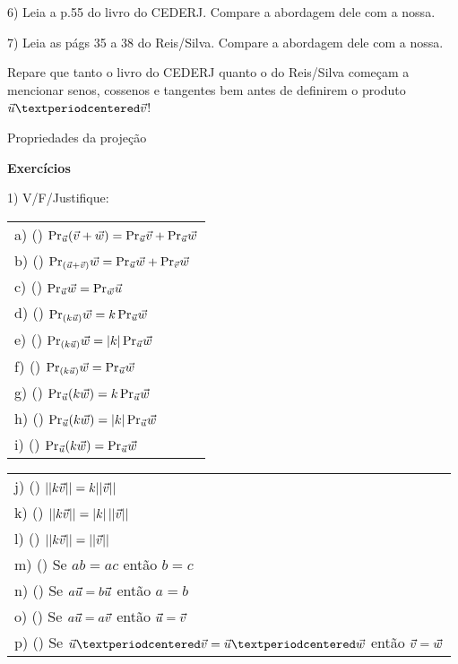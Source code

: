 \documentclass[oneside]{book}
\begin{document}
\bsk

6) Leia a p.55 do livro do CEDERJ. Compare a abordagem dele com a nossa.

7) Leia as págs 35 a 38 do Reis/Silva. Compare a abordagem dele com a
nossa.

Repare que tanto o livro do CEDERJ quanto o do Reis/Silva começam a
mencionar senos, cossenos e tangentes bem antes de definirem o produto
$\uu·\vv$!






\newpage

%
 {Propriedades da projeção}

{\bf Exercícios}

\ssk

1) V/F/Justifique:

\begin{tabular}[t]{l}
a) (\;\;) ${\text{Pr}}_{\vec u}({\vec v}+{\vec w}) = {\text{Pr}}_{\vec u} {\vec v} + {\text{Pr}}_{\vec u} {\vec w}$      \\
b) (\;\;) ${\text{Pr}}_{({\vec u}+{\vec v})} {\vec w} = {\text{Pr}}_{\vec u} {\vec w} + {\text{Pr}}_{\vec v} {\vec w}$   \\
c) (\;\;) ${\text{Pr}}_{\vec u} {\vec w} = {\text{Pr}}_{\vec w} {\vec u}$                         \\
d) (\;\;) ${\text{Pr}}_{(k{\vec u})} {\vec w} = k \, {\text{Pr}}_{\vec u} {\vec w}$               \\
e) (\;\;) ${\text{Pr}}_{(k{\vec u})} {\vec w} = |k| \, {\text{Pr}}_{\vec u} {\vec w}$             \\
f) (\;\;) ${\text{Pr}}_{(k{\vec u})} {\vec w} = {\text{Pr}}_{\vec u} {\vec w}$                    \\
g) (\;\;) ${\text{Pr}}_{\vec u} (k{\vec w}) = k \, {\text{Pr}}_{\vec u} {\vec w}$                 \\
h) (\;\;) ${\text{Pr}}_{\vec u} (k{\vec w}) = |k| \, {\text{Pr}}_{\vec u} {\vec w}$               \\
i) (\;\;) ${\text{Pr}}_{\vec u} (k{\vec w}) = {\text{Pr}}_{\vec u} {\vec w}$                      \\
\end{tabular}
\qquad
\begin{tabular}[t]{l}
j) (\;\;) $||k{\vec v}|| = k||{\vec v}||$                    \\
k) (\;\;) $||k{\vec v}|| = |k|\,||{\vec v}||$                \\
l) (\;\;) $||k{\vec v}|| = ||{\vec v}||$                     \\
m) (\;\;) Se $ab = ac$ então $b=c$                 \\
n) (\;\;) Se $a{\vec u} = b{\vec u}$ então $a=b$             \\
o) (\;\;) Se $a{\vec u} = a{\vec v}$ então ${\vec u}={\vec v}$         \\
p) (\;\;) Se $\uu·\vv = \uu·\ww$ então ${\vec v}={\vec w}$   \\
\end{tabular}
\end{document}
